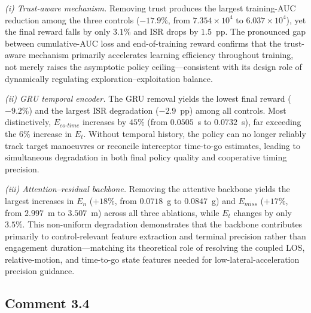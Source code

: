 \documentclass[11pt]{article}
\begin{document}
\begin{tcolorbox}[enhanced,breakable,colback=white,colframe=addblue!55,
coltext=addblue,fontupper=\color{addblue},
boxrule=0.6pt,arc=2pt,left=9pt,right=9pt,top=7pt,bottom=7pt]
\emph{(i) Trust-aware mechanism.}  Removing trust produces the largest training-AUC
reduction among the three controls ($-17.9\%$, from $7.354\!\times\!10^4$ to
$6.037\!\times\!10^4$), yet the final reward falls by only $3.1\%$ and ISR drops by
$1.5$~pp.  The pronounced gap between cumulative-AUC loss and end-of-training reward confirms
that the trust-aware mechanism primarily accelerates learning efficiency throughout training,
not merely raises the asymptotic policy ceiling---consistent with its design role of
dynamically regulating exploration--exploitation balance.


\medskip
\emph{(ii) GRU temporal encoder.}  The GRU removal yields the lowest final reward
($-9.2\%$) and the largest ISR degradation ($-2.9$~pp) among all controls.  Most
distinctively, $E_{co\text{-}time}$ increases by $45\%$ (from $0.0505$~s to $0.0732$~s),
far exceeding the $6\%$ increase in $E_t$.  Without temporal history, the policy can no
longer reliably track target manoeuvres or reconcile interceptor time-to-go estimates,
leading to simultaneous degradation in both final policy quality and cooperative timing
precision.

\medskip
\emph{(iii) Attention--residual backbone.}  Removing the attentive backbone yields the
largest increases in $E_n$ ($+18\%$, from $0.0718$~g to $0.0847$~g) and $E_{miss}$
($+17\%$, from $2.997$~m to $3.507$~m) across all three ablations, while $E_t$ changes by
only $3.5\%$.  This non-uniform degradation demonstrates that the backbone contributes
primarily to control-relevant feature extraction and terminal precision rather than
engagement duration---matching its theoretical role of resolving the coupled LOS,
relative-motion, and time-to-go state features needed for low-lateral-acceleration precision guidance.

\end{tcolorbox}





\subsection*{Comment 3.4}
\end{document}
